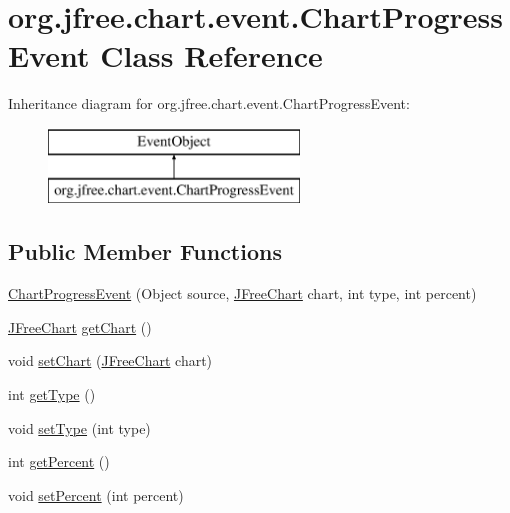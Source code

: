 \hypertarget{classorg_1_1jfree_1_1chart_1_1event_1_1_chart_progress_event}{}\section{org.\+jfree.\+chart.\+event.\+Chart\+Progress\+Event Class Reference}
\label{classorg_1_1jfree_1_1chart_1_1event_1_1_chart_progress_event}
Inheritance diagram for org.\+jfree.\+chart.\+event.\+Chart\+Progress\+Event\+:\begin{figure}[H]
\begin{center}
\leavevmode
\includegraphics[height=2.000000cm]{classorg_1_1jfree_1_1chart_1_1event_1_1_chart_progress_event}
\end{center}
\end{figure}
\subsection*{Public Member Functions}
\begin{DoxyCompactItemize}
\item 
\mbox{\hyperlink{classorg_1_1jfree_1_1chart_1_1event_1_1_chart_progress_event_a0511c6e9017fe400219cdeb447f499b2}{Chart\+Progress\+Event}} (Object source, \mbox{\hyperlink{classorg_1_1jfree_1_1chart_1_1_j_free_chart}{J\+Free\+Chart}} chart, int type, int percent)
\item 
\mbox{\hyperlink{classorg_1_1jfree_1_1chart_1_1_j_free_chart}{J\+Free\+Chart}} \mbox{\hyperlink{classorg_1_1jfree_1_1chart_1_1event_1_1_chart_progress_event_abe75c42e2a3b71a4de7827bda27c6c41}{get\+Chart}} ()
\item 
void \mbox{\hyperlink{classorg_1_1jfree_1_1chart_1_1event_1_1_chart_progress_event_a809253c14d62e53ddf787fec8282db08}{set\+Chart}} (\mbox{\hyperlink{classorg_1_1jfree_1_1chart_1_1_j_free_chart}{J\+Free\+Chart}} chart)
\item 
int \mbox{\hyperlink{classorg_1_1jfree_1_1chart_1_1event_1_1_chart_progress_event_adcd2bd63c33c046c295ffc2231c9a884}{get\+Type}} ()
\item 
void \mbox{\hyperlink{classorg_1_1jfree_1_1chart_1_1event_1_1_chart_progress_event_a27e07d141dedfb84e65434b5b84b3c96}{set\+Type}} (int type)
\item 
int \mbox{\hyperlink{classorg_1_1jfree_1_1chart_1_1event_1_1_chart_progress_event_ab747f522440939cb389f4500e3d14d61}{get\+Percent}} ()
\item 
void \mbox{\hyperlink{classorg_1_1jfree_1_1chart_1_1event_1_1_chart_progress_event_af81a9d06e7f0d524b7d10cdb6d6428f9}{set\+Percent}} (int percent)
\end{DoxyCompactItemize}
